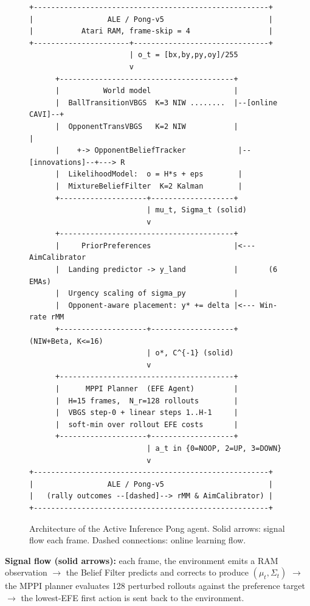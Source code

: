 \documentclass[12pt, a4paper]{article}
\newcommand{\1}{\mathbf{1}}
\begin{document}
\begin{figure}[ht]
\centering
\begin{lstlisting}[basicstyle=\scriptsize\ttfamily, frame=none, backgroundcolor=\color{white}]
+------------------------------------------------------+
|                 ALE / Pong-v5                        |
|           Atari RAM, frame-skip = 4                  |
+----------------------+-------------------------------+
                       | o_t = [bx,by,py,oy]/255
                       v
      +----------------------------------------+
      |          World model                   |
      |  BallTransitionVBGS  K=3 NIW ........  |--[online CAVI]--+
      |  OpponentTransVBGS   K=2 NIW           |                 |
      |    +-> OpponentBeliefTracker            |--[innovations]--+---> R
      |  LikelihoodModel:  o = H*s + eps        |
      |  MixtureBeliefFilter  K=2 Kalman        |
      +--------------------+-------------------+
                           | mu_t, Sigma_t (solid)
                           v
      +----------------------------------------+
      |     PriorPreferences                   |<--- AimCalibrator
      |  Landing predictor -> y_land           |       (6 EMAs)
      |  Urgency scaling of sigma_py           |
      |  Opponent-aware placement: y* += delta |<--- Win-rate rMM
      +--------------------+-------------------+     (NIW+Beta, K<=16)
                           | o*, C^{-1} (solid)
                           v
      +----------------------------------------+
      |      MPPI Planner  (EFE Agent)         |
      |  H=15 frames,  N_r=128 rollouts        |
      |  VBGS step-0 + linear steps 1..H-1     |
      |  soft-min over rollout EFE costs       |
      +--------------------+-------------------+
                           | a_t in {0=NOOP, 2=UP, 3=DOWN}
                           v
+------------------------------------------------------+
|                 ALE / Pong-v5                        |
|   (rally outcomes --[dashed]--> rMM & AimCalibrator) |
+------------------------------------------------------+
\end{lstlisting}
\caption{Architecture of the Active Inference Pong agent. Solid arrows: signal
  flow each frame. Dashed connections: online learning flow.}
\label{fig:architecture}
\end{figure}

\textbf{Signal flow (solid arrows):} each frame, the environment emits a RAM
observation $\to$ the Belief Filter predicts and corrects to produce
$(\mu_t, \Sigma_t)$ $\to$ the MPPI planner evaluates 128 perturbed rollouts
against the preference target $\to$ the lowest-EFE first action is sent back to
the environment.
\end{document}
